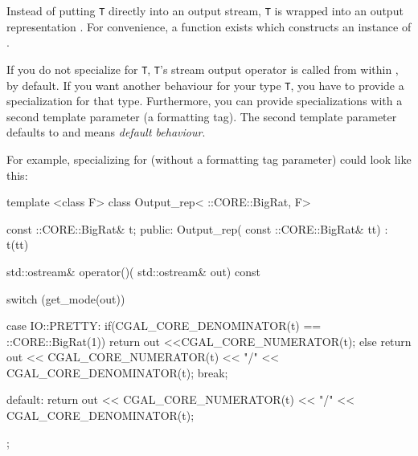 Instead of putting \texttt{T} directly into an output stream, \texttt{T} is wrapped into an output representation . For convenience, a function  exists which constructs an instance of .

If you do not specialize  for \texttt{T}, \texttt{T}'s stream output operator is called from within , by default. If you want another behaviour for your type \texttt{T}, you have to provide a specialization for that type. Furthermore, you can provide specializations with a second template parameter (a formatting tag). The second template parameter defaults to  and means \textit{default behaviour}.

For example, specializing  for  (without a formatting tag parameter) could look like this:

\ccExample
\begin{ccExampleCode}
template <class F>
class Output_rep< ::CORE::BigRat, F> {
    const ::CORE::BigRat& t;
public:
    Output_rep( const ::CORE::BigRat& tt) : t(tt) {}

    std::ostream& operator()( std::ostream& out) const {
        switch (get_mode(out)) {
        case IO::PRETTY:{
            if(CGAL_CORE_DENOMINATOR(t) == ::CORE::BigRat(1))
                return out <<CGAL_CORE_NUMERATOR(t);
            else
                return out << CGAL_CORE_NUMERATOR(t)
                           << "/"
                           << CGAL_CORE_DENOMINATOR(t);
            break;
        }

        default:
            return out << CGAL_CORE_NUMERATOR(t)
                       << "/"
                       << CGAL_CORE_DENOMINATOR(t);
        }
    }
};
\end{ccExampleCode}
